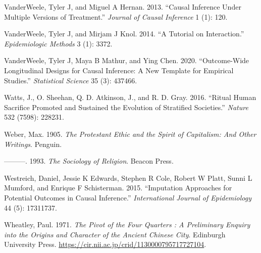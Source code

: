 \documentclass[
  singlecolumn]{report}
\newlength{\cslhangindent}
\newlength{\cslentryspacingunit} %
\newenvironment{CSLReferences}[2] %
 {%
  \setlength{\parindent}{0pt}
  \ifodd #1
  \let\oldpar\par
  \def\par{\hangindent=\cslhangindent\oldpar}
  \fi
  \setlength{\parskip}{#2\cslentryspacingunit}
 }%
 {}
\begin{document}
\begin{CSLReferences}{1}{0}
\leavevmode{}%
VanderWeele, Tyler J, and Miguel A Hernan. 2013. {``Causal Inference
Under Multiple Versions of Treatment.''} \emph{Journal of Causal
Inference} 1 (1): 120.

\leavevmode{}%
VanderWeele, Tyler J, and Mirjam J Knol. 2014. {``A Tutorial on
Interaction.''} \emph{Epidemiologic Methods} 3 (1): 3372.

\leavevmode{}%
VanderWeele, Tyler J, Maya B Mathur, and Ying Chen. 2020.
{``Outcome-Wide Longitudinal Designs for Causal Inference: A New
Template for Empirical Studies.''} \emph{Statistical Science} 35 (3):
437466.

\leavevmode{}%
Watts, J., O. Sheehan, Q. D. Atkinson, J., and R. D. Gray. 2016.
{``Ritual Human Sacrifice Promoted and Sustained the Evolution of
Stratified Societies.''} \emph{Nature} 532 (7598): 228231.

\leavevmode{}%
Weber, Max. 1905. \emph{The Protestant Ethic and the Spirit of
Capitalism: And Other Writings}. Penguin.

\leavevmode{}%
---------. 1993. \emph{The Sociology of Religion}. Beacon Press.

\leavevmode{}%
Westreich, Daniel, Jessie K Edwards, Stephen R Cole, Robert W Platt,
Sunni L Mumford, and Enrique F Schisterman. 2015. {``Imputation
Approaches for Potential Outcomes in Causal Inference.''}
\emph{International Journal of Epidemiology} 44 (5): 17311737.

\leavevmode{}%
Wheatley, Paul. 1971. \emph{The Pivot of the Four Quarters : A
Preliminary Enquiry into the Origins and Character of the Ancient
Chinese City}. Edinburgh University Press.
\url{https://cir.nii.ac.jp/crid/1130000795717727104}.

\end{CSLReferences}
\end{document}
